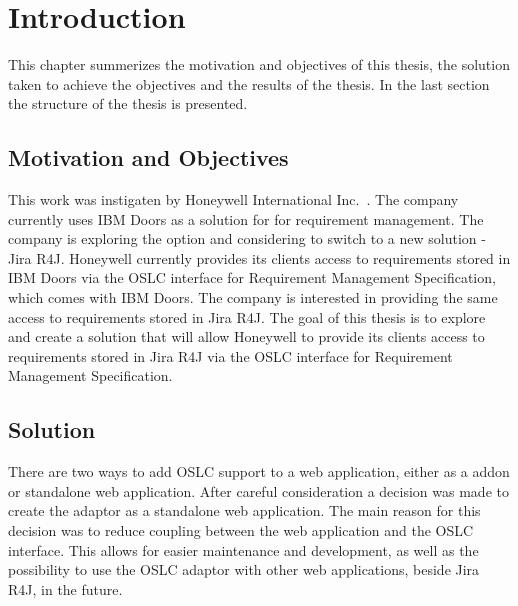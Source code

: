 
% 

\chapter{Introduction}
This chapter summerizes the motivation and objectives of this thesis, the solution taken to achieve the objectives and the results of the thesis. In the last section the structure of the thesis is presented.

\section{Motivation and Objectives}
This work was instigaten by Honeywell International Inc. \cite{honeywell}. The company currently uses IBM Doors as a solution for for requirement management. The company is exploring the option and considering to switch to a new solution - Jira R4J. Honeywell currently provides its clients access to requirements stored in IBM Doors via the OSLC interface for Requirement Management Specification, which comes with IBM Doors. The company is interested in providing the same access to requirements stored in Jira R4J. The goal of this thesis is to explore and create a solution that will allow Honeywell to provide its clients access to requirements stored in Jira R4J via the OSLC interface for Requirement Management Specification.

\section{Solution}
There are two ways to add OSLC support to a web application, either as a addon or standalone web application. After careful consideration a decision was made to create the adaptor as a standalone web application. The main reason for this decision was to reduce coupling between the web application and the OSLC interface. This allows for easier maintenance and development, as well as the possibility to use the OSLC adaptor with other web applications, beside Jira R4J, in the future. 

